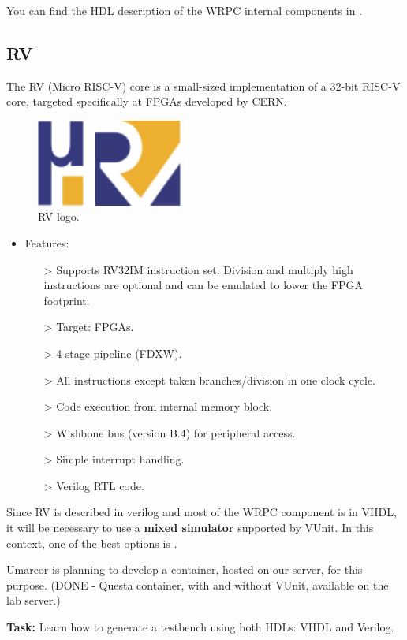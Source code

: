 \noindent You can find the HDL description of the WRPC internal components in \cite{WRPC:modules}.

\newpage

\subsection{\textmu RV}

The \textmu RV \cite{urv-core:ohwr} \cite{urv-core:wiki} \cite{Włostowski:2213516} (Micro RISC-V) core is a small-sized implementation of a 32-bit RISC-V core, targeted specifically at FPGAs developed by CERN. 

\begin{figure}[H]
    \centering
    \includegraphics[width=5cm]{figures/urv_logo.png}
    \caption{\textmu RV logo.}
    \label{fig:urv}
\end{figure}

\begin{itemize}
\item Features:
    \begin{itemize}
    \item[>] Supports RV32IM instruction set. 
Division and multiply high instructions are optional and can be emulated to lower the FPGA footprint.
    \item[>] Target: FPGAs.
    \item[>] 4-stage pipeline (FDXW).
    \item[>] All instructions except taken branches/division in one clock cycle.
    \item[>] Code execution from internal memory block.
    \item[>] Wishbone bus (version B.4) for peripheral access.
    \item[>] Simple interrupt handling.
    \item[>] Verilog RTL code.
    \end{itemize}
\end{itemize}

\noindent Since \textmu RV is described in verilog and most of the WRPC component is in VHDL, it will be necessary to use a \textbf{mixed simulator} supported by VUnit.
In this context, one of the best options is .

\vspace{5mm}

\noindent \href{https://github.com/umarcor}{Umarcor} is planning to develop a container, hosted on our server, for this purpose. 
(DONE - Questa container, with and without VUnit, available on the lab server.)

\vspace{5mm}

\noindent \textbf{Task:} Learn how to generate a testbench using both HDLs: VHDL and Verilog.

